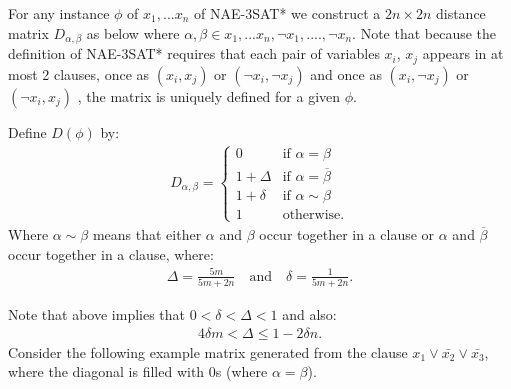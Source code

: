 For any instance $\phi$ of $x_1,...x_n$ of NAE-3SAT* we construct a
$2n \times 2n$ distance matrix $D_{\alpha,\beta}$ as below where
$\alpha,\beta \in x_1,...x_n, \neg x_1,....,\neg x_n$.  Note that
because the definition of NAE-3SAT* requires that each pair of
variables $x_i$, $x_j$ appears in at most 2 clauses, once as
$(x_i,x_j)$ or $(\neg x_i, \neg x_j)$ and once as  $(x_i,\neg x_j)$ or
$(\neg x_i, x_j)$ , the matrix is uniquely defined for a given
$\phi$. 
\begin{definition} \label{2-means-distance-matrix} Define
  $D(\phi)$ by:
\begin{align}
  D_{\alpha,\beta} = \begin{cases}
    0 & \textrm{if } \alpha = \beta\\
    1+\Delta  & \mbox{if } \alpha = \overline{\beta} \\
    1+\delta  & \mbox{if } \alpha \sim \beta \\
    1 & \textrm{otherwise}.
  \end{cases}
\end{align}
Where $ \alpha \sim \beta$ means that either $\alpha$ and $\beta$
occur together in a clause or $\alpha$ and $\overline{\beta} $ occur
together in a clause, where:
\begin{align}
  \Delta = \frac{5m}{5m + 2n} \quad\textrm{and}
  \quad\delta = \frac{1}{5m  + 2n}.
\end{align}
\end{definition}
Note that above implies that $0 < \delta < \Delta < 1$ and also:
\begin{align}
4 \delta m < \Delta \le 1 - 2 \delta n.
\end{align}
Consider the following example matrix generated from the clause $x_1 \vee \bar{x_2} \vee \bar{x_3}$, where the diagonal is filled with 0s (where $\alpha=\beta$).


